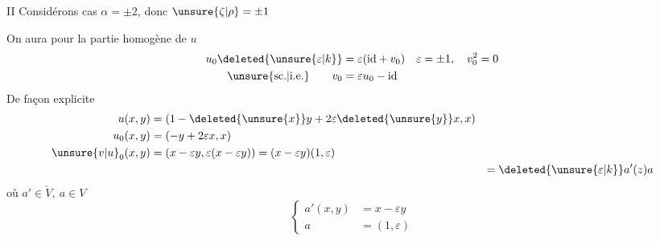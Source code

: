 II Considérons  cas $\alpha=\pm2$, donc $\unsure{\zeta|\rho}=\pm1$

On aura pour la partie homogène  de $u$
\[
\begin{aligned}
u_0\deleted{\unsure{\varepsilon|k}}&=\varepsilon(\mathrm{id}+v_0) &\varepsilon&=\pm1,\quad v_0^2=0\\
\text{\unsure{sc.|i.e.}}\qquad v_0&=\varepsilon u_0-\mathrm{id}
\end{aligned}
\]
De façon explicite
\[
\begin{aligned}
u(x,y)&=(1-\deleted{\unsure{x}}y+2\varepsilon\deleted{\unsure{y}}x,x)\\
u_0(x,y)&=(-y+2\varepsilon x,x)\\
\unsure{v|u}_0(x,y)&=(x-\varepsilon y,\varepsilon(x-\varepsilon y))=(x-\varepsilon y)(1,\varepsilon)\\
&&=\deleted{\unsure{\varepsilon|k}}a'(z)a
\end{aligned}
\]
où  $a'\in\check V,\ a\in V$
\[
\left\{\begin{aligned}
a'(x,y)&=x-\varepsilon y\\
a&=(1,\varepsilon)
\end{aligned}\right.
\]
